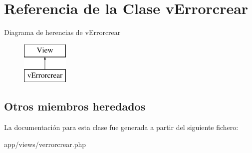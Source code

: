 \hypertarget{classv_errorcrear}{}\section{Referencia de la Clase v\+Errorcrear}
\label{classv_errorcrear}
Diagrama de herencias de v\+Errorcrear\begin{figure}[H]
\begin{center}
\leavevmode
\includegraphics[height=2.000000cm]{classv_errorcrear}
\end{center}
\end{figure}
\subsection*{Otros miembros heredados}


La documentación para esta clase fue generada a partir del siguiente fichero\+:\begin{DoxyCompactItemize}
\item 
app/views/verrorcrear.\+php\end{DoxyCompactItemize}

